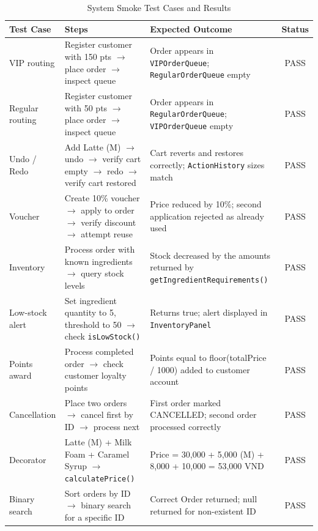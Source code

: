 \documentclass[11pt,a4paper]{article}
\begin{document}
\begin{table}[H]
\centering
\caption{System Smoke Test Cases and Results}
\label{tab:test_cases}
\small
\begin{tabular}{lp{4.2cm}p{5.8cm}c}
\toprule
\textbf{Test Case} & \textbf{Steps} & \textbf{Expected Outcome} & \textbf{Status} \\
\midrule
VIP routing & Register customer with 150 pts $\rightarrow$ place order $\rightarrow$ inspect queue & Order appears in \texttt{VIPOrderQueue}; \texttt{RegularOrderQueue} empty & PASS \\
\addlinespace
Regular routing & Register customer with 50 pts $\rightarrow$ place order $\rightarrow$ inspect queue & Order appears in \texttt{RegularOrderQueue}; \texttt{VIPOrderQueue} empty & PASS \\
\addlinespace
Undo / Redo & Add Latte (M) $\rightarrow$ undo $\rightarrow$ verify cart empty $\rightarrow$ redo $\rightarrow$ verify cart restored & Cart reverts and restores correctly; \texttt{ActionHistory} sizes match & PASS \\
\addlinespace
Voucher & Create 10\% voucher $\rightarrow$ apply to order $\rightarrow$ verify discount $\rightarrow$ attempt reuse & Price reduced by 10\%; second application rejected as already used & PASS \\
\addlinespace
Inventory & Process order with known ingredients $\rightarrow$ query stock levels & Stock decreased by the amounts returned by \texttt{getIngredientRequirements()} & PASS \\
\addlinespace
Low-stock alert & Set ingredient quantity to 5, threshold to 50 $\rightarrow$ check \texttt{isLowStock()} & Returns true; alert displayed in \texttt{InventoryPanel} & PASS \\
\addlinespace
Points award & Process completed order $\rightarrow$ check customer loyalty points & Points equal to floor(totalPrice / 1000) added to customer account & PASS \\
\addlinespace
Cancellation & Place two orders $\rightarrow$ cancel first by ID $\rightarrow$ process next & First order marked CANCELLED; second order processed correctly & PASS \\
\addlinespace
Decorator & Latte (M) + Milk Foam + Caramel Syrup $\rightarrow$ \texttt{calculatePrice()} & Price = 30,000 + 5,000 (M) + 8,000 + 10,000 = 53,000 VND & PASS \\
\addlinespace
Binary search & Sort orders by ID $\rightarrow$ binary search for a specific ID & Correct Order returned; null returned for non-existent ID & PASS \\
\bottomrule
\end{tabular}
\end{table}
\end{document}
